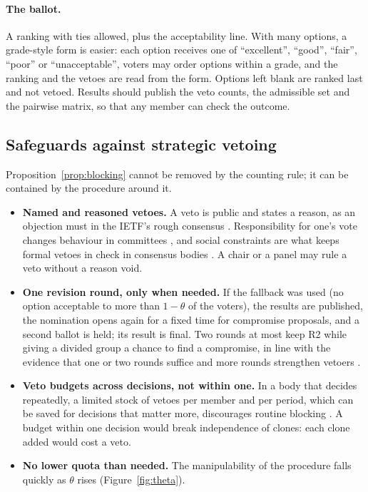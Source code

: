 \paragraph{The ballot.} A ranking with ties allowed, plus the acceptability line. With many options,
a grade-style form is easier: each option receives one of ``excellent'', ``good'', ``fair'', ``poor'' or
``unacceptable'', voters may order options within a grade, and the ranking and the vetoes are read from
the form. Options left blank are ranked last and not vetoed. Results should publish the veto counts, the
admissible set and the pairwise matrix, so that any member can check the outcome.

\subsection{Safeguards against strategic vetoing}\label{sec:safeguards}

Proposition~\ref{prop:blocking} cannot be removed by the counting rule; it can be contained by the
procedure around it.
\begin{itemize}
  \item \textbf{Named and reasoned vetoes.} A veto is public and states a reason, as an objection must in
  the IETF's rough consensus \citep{Resnick2014rfc7282}. Responsibility for one's vote changes behaviour in
  committees \citep{BreitmoserValasek2024}, and social constraints are what keeps formal vetoes in check
  in consensus bodies \citep{Krick2017}. A chair or a panel may rule a veto without a reason void.
  \item \textbf{One revision round, only when needed.} If the fallback was used (no option acceptable
  to more than $1-\theta$ of the voters), the results are published, the nomination opens again for a
  fixed time for compromise proposals, and a second ballot is held; its result is final. Two rounds at
  most keep R2 while giving a divided group a chance to find a compromise, in line with the evidence that
  one or two rounds suffice and more rounds strengthen vetoers
  \citep{GersbachValkanova2024,Nunnari2021}.
  \item \textbf{Veto budgets across decisions, not within one.} In a body that decides repeatedly, a
  limited stock of vetoes per member and per period, which can be saved for decisions that matter more,
  discourages routine blocking \citep[on storable votes]{Casella2005}. A budget within one decision would
  break independence of clones: each clone added would cost a veto.
  \item \textbf{No lower quota than needed.} The manipulability of the procedure falls quickly as
  $\theta$ rises (Figure~\ref{fig:theta}).
\end{itemize}

